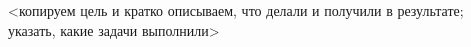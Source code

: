
<копируем цель и кратко описываем, что делали и получили в результате; указать, какие задачи выполнили>
